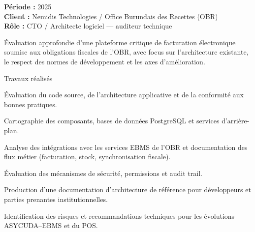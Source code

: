 \newpage
{}

\cvgroupreset

\begin{cvgroup}

\begin{cvmetadata}
\textbf{Période :} 2025 \\
\textbf{Client :} Nemidis Technologies / Office Burundais des Recettes (OBR) \\
\textbf{Rôle :} CTO / Architecte logiciel — auditeur technique
\end{cvmetadata}

\begin{cvprojectsummary}
Évaluation approfondie d'une plateforme critique de facturation électronique soumise aux obligations fiscales de l'OBR, avec focus sur l'architecture existante, le respect des normes de développement et les axes d'amélioration.
\end{cvprojectsummary}

\begin{cvdetailslist}{Travaux réalisés}
  \item {Évaluation du code source, de l'architecture applicative et de la conformité aux bonnes pratiques.}
  \item {Cartographie des composants, bases de données PostgreSQL et services d'arrière-plan.}
  \item {Analyse des intégrations avec les services EBMS de l'OBR et documentation des flux métier (facturation, stock, synchronisation fiscale).}
  \item {Évaluation des mécanismes de sécurité, permissions et audit trail.}
  \item {Production d'une documentation d'architecture de référence pour développeurs et parties prenantes institutionnelles.}
  \item {Identification des risques et recommandations techniques pour les évolutions ASYCUDA–EBMS et du POS.}
\end{cvdetailslist}


\end{cvgroup}

